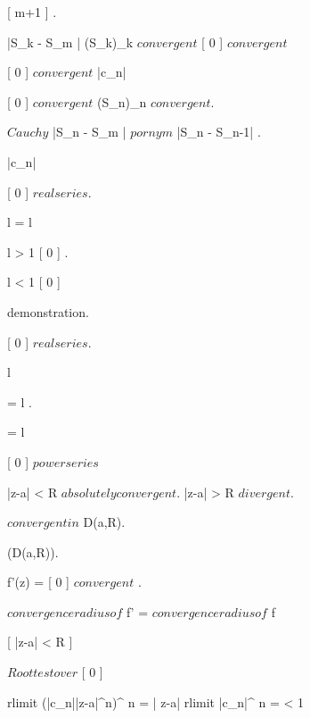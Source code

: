 \documentclass[../Main/main]{subfiles}
\begin{document}
{{{{				\leq {}[ m+1 ] .

				|S_k - S_m |  \imp (S_k)_k $ convergent $ \imp {}[ 0 ] $ convergent $
			}
		}
	}
	
	
	{
		{
			[ 0 ] $ convergent $
		}
		\holds
		{
			|c_n| 
		}
		\demonstration
		{
			[ 0 ] $ convergent $ \ifandonlyif (S_n)_n $ convergent $.

			\imp $ Cauchy $ |S_n - S_m |  $ por n y m $ \imp |S_n - S_{n-1}| .

			\imp |c_n| 
		}
	}
	
	
	{
		{
			[ 0 ] $ real series $.

			l \in \R \suchthat {} = l
		}
		\holds
		{
			l > 1 \imp {}[ 0 ] \nin \R.

			l < 1 \imp {}[ 0 ] \in \R
		}
		\demonstration
		{
			demonstration.
		}
	}
	
	
	{
		{
			[ 0 ] $ real series $.

			l \in \R \suchthat 
		}
		\holds
		{
			{
				 = l
			}.

			 = l
		}
	}
	
	
	
	
	
	{
		{
			[ 0 ] $ power series $
		}
		\holds
		{
			|z-a| < R \imp $ absolutely convergent $.
			|z-a| > R \imp $ divergent $.

			$ convergent in $ D(a,R).

			 \in \Hc(D(a,R)).

			{
				f'(z) = [ 0 ] $ convergent $ 
			}.

			$ convergence radius of $ f' = $ convergence radius of $ f
		}
		\demonstration
		{
			 [ |z-a| < R ]
			 {
			 	$ Root test over $ [ 0 ]

			 	rlimit{ (|c_n||z-a|^n)^{} }{ n } =
			 	|
	z-a| rlimit{ |c_n|^{} }{ n } =  < 1
	

}}}}
\end{document}
